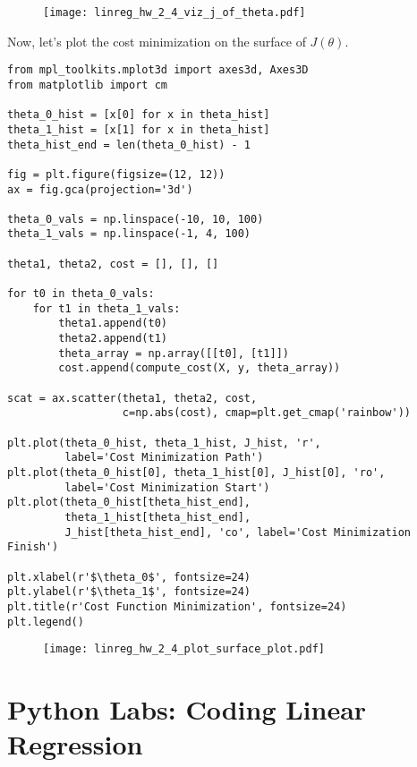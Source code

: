 \begin{figure}[h] %
	\centering
	\graphicspath{{./Figures/}} %
	\texttt{[image: linreg\_hw\_2\_4\_viz\_j\_of\_theta.pdf]} 
	\label{linreg_hw_2_4_viz_j_of_theta.pdf}
\end{figure}

Now, let's plot the cost minimization on the surface of $J\left(\theta\right)$. 

\begin{verbatim}
from mpl_toolkits.mplot3d import axes3d, Axes3D
from matplotlib import cm

theta_0_hist = [x[0] for x in theta_hist]
theta_1_hist = [x[1] for x in theta_hist]
theta_hist_end = len(theta_0_hist) - 1

fig = plt.figure(figsize=(12, 12))
ax = fig.gca(projection='3d')

theta_0_vals = np.linspace(-10, 10, 100)
theta_1_vals = np.linspace(-1, 4, 100)

theta1, theta2, cost = [], [], []

for t0 in theta_0_vals:
    for t1 in theta_1_vals:
        theta1.append(t0)
        theta2.append(t1)
        theta_array = np.array([[t0], [t1]])
        cost.append(compute_cost(X, y, theta_array))

scat = ax.scatter(theta1, theta2, cost, 
                  c=np.abs(cost), cmap=plt.get_cmap('rainbow'))

plt.plot(theta_0_hist, theta_1_hist, J_hist, 'r',
         label='Cost Minimization Path')
plt.plot(theta_0_hist[0], theta_1_hist[0], J_hist[0], 'ro',
         label='Cost Minimization Start')
plt.plot(theta_0_hist[theta_hist_end],
         theta_1_hist[theta_hist_end],
         J_hist[theta_hist_end], 'co', label='Cost Minimization Finish')

plt.xlabel(r'$\theta_0$', fontsize=24)
plt.ylabel(r'$\theta_1$', fontsize=24)
plt.title(r'Cost Function Minimization', fontsize=24)
plt.legend()
\end{verbatim}

\begin{figure}[h] %
	\centering
	\graphicspath{{./Figures/}} %
	\texttt{[image: linreg\_hw\_2\_4\_plot\_surface\_plot.pdf]} 
	\label{linreg_hw_2_4_plot_surface_plot.pdf}
\end{figure}

\section{Python Labs: Coding Linear Regression}




















